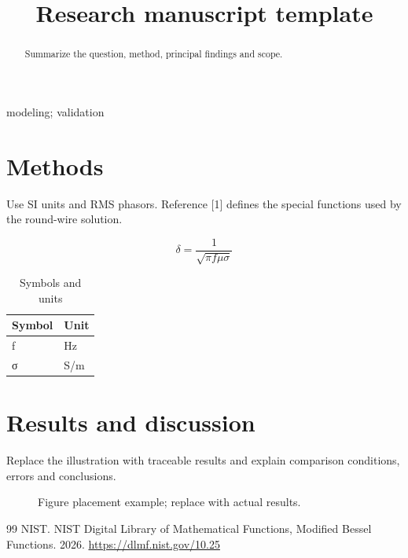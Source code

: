 \documentclass[conference]{IEEEtran}
\begin{document}
\title{Research manuscript template}
\author{}
\maketitle
\begin{abstract}
Summarize the question, method, principal findings and scope.
\end{abstract}
\begin{IEEEkeywords}
modeling; validation
\end{IEEEkeywords}
\section{Methods}
\hypertarget{chapter-01}{}
Use SI units and RMS phasors. Reference [1] defines the special functions used by the round-wire solution.

\begin{equation}\delta=\frac{1}{\sqrt{\pi f\mu\sigma}}\label{eq:skin}\end{equation}
\begin{table}[!htbp]
\centering
\caption{Symbols and units}
\begingroup\footnotesize
\begin{tabularx}{\textwidth}{>{\raggedright\arraybackslash}X>{\raggedright\arraybackslash}X}
\toprule
Symbol & Unit\\
\midrule
f & Hz\\
σ & S/m\\
\bottomrule
\end{tabularx}\endgroup
\end{table}
\section{Results and discussion}
\hypertarget{chapter-02}{}
Replace the illustration with traceable results and explain comparison conditions, errors and conclusions.

\renewcommand{\refname}{References}
\begin{figure}[!htbp]\centering\fbox{\rule{0pt}{22mm}\rule{.8\linewidth}{0pt}}\caption{Figure placement example; replace with actual results.}\label{fig:example}\end{figure}
\begin{thebibliography}{99}
 NIST. NIST Digital Library of Mathematical Functions, Modified Bessel Functions. 2026. \url{https://dlmf.nist.gov/10.25}
\end{thebibliography}
\end{document}

